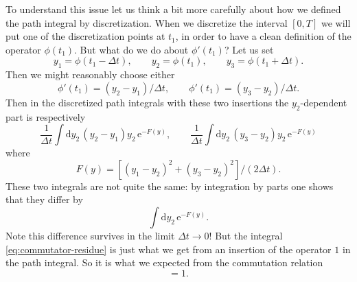 \documentclass[12pt,letterpaper,reqno]{article}
\numberwithin{equation}{section}
\newcommand{\e}{{\mathrm e}}
\newcommand{\de}{\mathrm{d}}
\begin{document}
To understand this issue let us think a bit more carefully
about how we defined the path integral by discretization.
When we discretize the interval $[0,T]$ we will put one
of the discretization points at $t_1$, in order to have
a clean definition of the operator $\phi(t_1)$.
But what do we do about $\phi'(t_1)$?
Let us set
\begin{equation}
  y_1 = \phi(t_1 - \Delta t), \qquad y_2 = \phi(t_1), \qquad y_3 = \phi(t_1 + \Delta t).
\end{equation}
Then we might reasonably choose either 
\begin{equation}
  \phi'(t_1) = (y_2 - y_1) / \Delta t, \qquad \phi'(t_1) = (y_3 - y_2) / \Delta t.
\end{equation}
Then in the discretized path integrals with these two 
insertions the $y_2$-dependent part is respectively
\begin{equation}
  \frac{1}{\Delta t} \int \de y_2 \, (y_2 - y_1) y_2 \, \e^{-F(y)}, \qquad
  \frac{1}{\Delta t} \int \de y_2 \, (y_3 - y_2) y_2 \, \e^{-F(y)}
\end{equation}
where
\begin{equation}
  F(y) = [(y_1 - y_2)^2 + (y_3 - y_2)^2] / (2 \Delta t).
\end{equation}
These two integrals are not quite the same:
by integration by parts one shows that they differ by
\begin{equation} \label{eq:commutator-residue}
  \int \de y_2 \, \e^{-F(y)}.
\end{equation}
Note this difference survives in the limit 
$\Delta t \to 0$!
But the integral \eqref{eq:commutator-residue} is just what we get from an insertion
of the operator $1$ in the path integral.
So it is what we expected from the commutation relation
\begin{equation}
  [\hat p, \hat q] = 1.
\end{equation}
\end{document}
